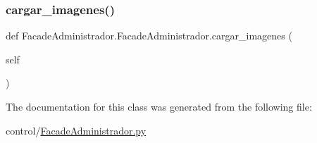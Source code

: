 \subsubsection{\texorpdfstring{cargar\+\_\+imagenes()}{cargar\_imagenes()}}
{\footnotesize\ttfamily def Facade\+Administrador.\+Facade\+Administrador.\+cargar\+\_\+imagenes (\begin{DoxyParamCaption}\item[{}]{self }\end{DoxyParamCaption})}



The documentation for this class was generated from the following file\+:\begin{DoxyCompactItemize}
\item 
control/\mbox{\hyperlink{_facade_administrador_8py}{Facade\+Administrador.\+py}}\end{DoxyCompactItemize}
